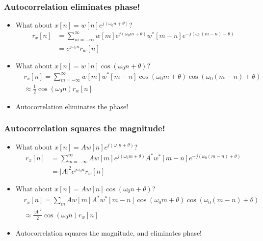 \documentclass{beamer}
\begin{document}
\begin{frame}
  \frametitle{Autocorrelation eliminates phase!}

  \begin{itemize}
    \item What about $x[n]=w[n]e^{j(\omega_0 n+\theta)}$?
      \begin{align*}
        r_x[n]
        &= \sum_{m=-\infty}^\infty w[m]e^{j(\omega_0 m+\theta)}w^*[m-n]e^{-j(\omega_0(m-n)+\theta)}\\
        &= e^{j\omega_0 n} r_w[n]
      \end{align*}
    \item What about $x[n]=w[n]\cos(\omega_0 n+\theta)$?
      \begin{align*}
        &r_x[n] = 
        \sum_{m=-\infty}^\infty w[m]w^*[m-n]\cos(\omega_0m+\theta)\cos(\omega_0(m-n)+\theta) \\
        &\approx \frac{1}{2}\cos(\omega_0 n)r_w[n]
      \end{align*}
    \item Autocorrelation eliminates the phase!
  \end{itemize}
\end{frame}

\begin{frame}
  \frametitle{Autocorrelation squares the magnitude!}

  \begin{itemize}
    \item What about $x[n]=Aw[n]e^{j(\omega_0 n+\theta)}$?
      \begin{align*}
        r_x[n]
        &= \sum_{m=-\infty}^\infty Aw[m]e^{j(\omega_0 m+\theta)}A^*w^*[m-n]e^{-j(\omega_0(m-n)+\theta)}\\
        &= |A|^2 e^{j\omega_0 n} r_w[n]
      \end{align*}
    \item What about $x[n]=Aw[n]\cos(\omega_0 n+\theta)$?
      \begin{align*}
        &r_x[n] = 
        \sum_m Aw[m]A^*w^*[m-n]\cos(\omega_0m+\theta)\cos(\omega_0(m-n)+\theta) \\
        &\approx \frac{|A|^2}{2}\cos(\omega_0 n)r_w[n]
      \end{align*}
    \item Autocorrelation squares the magnitude, and eliminates phase!
  \end{itemize}
\end{frame}
\end{document}
